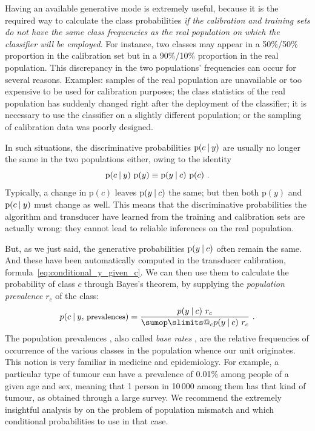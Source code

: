 \documentclass[\ifafour a4paper,12pt,\else a5paper,10pt,\fi%
onecolumn,oneside,article,%
british%
]{memoir}
\makeatletter
\theoremstyle{remark}
\theoremstyle{innote}
\def\sum{\DOTSI\sumop\slimits@}
\newcommand*{\p}{\mathrm{p}}%
\renewcommand*{\|}[1][]{\nonscript\:#1\vert\nonscript\:\mathopen{}}
\newcommand*{\sect}{\S}%
\newcommand*{\chap}{ch.}%
\newcommand*{\texts}[1]{\text{\small #1}}
\newcommand*{\br}{r}
\makeatother
\begin{document}
Having an available generative mode is extremely useful, because it is the required way to calculate the class probabilities \emph{if the calibration and training sets do not have the same class frequencies as the real population on which the classifier will be employed}. For instance, two classes may appear in a 50\%/50\% proportion in the calibration set but in a 90\%/10\% proportion in the real population. This discrepancy in the two populations' frequencies can occur for several reasons. Examples: samples of the real population are unavailable or too expensive to be used for calibration purposes; the class statistics of the real population has suddenly changed right after the deployment of the classifier; it is necessary to use the classifier on a slightly different population; or the sampling of calibration data was poorly designed.

In such situations, the discriminative probabilities $\p(c \| y)$ are usually no longer the same in the two populations either, owing to the identity
\begin{equation}
  \label{eq:identity_conditionals}
  \p(c \| y)\ \p(y) \equiv \p(y \| c)\ \p(c) \ .
\end{equation}
Typically, a change in $\p(c)$ leaves $\p(y \| c)$ the same; but then both $\p(y)$ and $\p(c \| y)$ must change as well. This means that the discriminative probabilities the algorithm and transducer have learned from the training and calibration sets are actually wrong: they cannot lead to reliable inferences on the real population.

But, as we just said, the generative probabilities $\p(y \| c)$ often remain the same. And these have been automatically computed in the transducer calibration, formula~\eqref{eq:conditional_y_given_c}.
We can then use them to calculate the probability of class $c$ through Bayes's theorem, by supplying the \emph{population prevalence} $\br_{c}$ of the class:
\begin{equation}
  \label{eq:bayes_baserate}
  p(c \| y,\, \texts{prevalences}) = \frac{p(y \| c)\ \br_{c}}{ \sum_{c} p(y \| c)\ \br_{c} } \ .
\end{equation}
The population prevalences \autocites[\chap~3]{soxetal1988_r2013}[\sect~5.1]{huninketal2001_r2014}, also called \emph{base rates} \autocites{barhillel1980,axelsson2000}, are the relative frequencies of occurrence of the various classes in the population whence our unit originates. This notion is very familiar in medicine and epidemiology. For example, a particular type of tumour can have a prevalence of 0.01\% among people of a given age and sex, meaning that 1 person in 10\,000 among them has that kind of tumour, as obtained through a large survey. We recommend the extremely insightful analysis by \cites{lindleyetal1981} on the problem of population mismatch and which conditional probabilities to use in that case.
\end{document}
